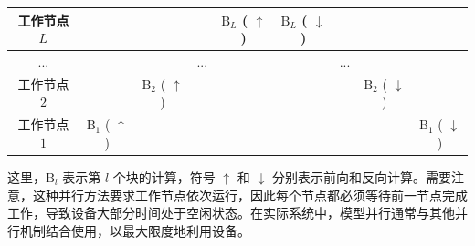\begin{itemize}
    \vspace{0.5em}
    \begin{center}
    \begingroup
    \renewcommand{\arraystretch}{1.6}
    \setlength{\tabcolsep}{2pt}
    {\small
    \begin{tabular}{c | c c c c c c c c}
    工作节点 $L$ & & & & \colorbox{blue!30}{$\mathrm{B}_L$} ({\color{blue} $\uparrow$}) & \colorbox{red!30}{$\mathrm{B}_L$} ({\color{red} $\downarrow$}) & & & \\ \hline
    ... & & & ... & & & ... & & \\ \hline
    工作节点 $2$ & & \colorbox{blue!30}{$\mathrm{B}_2$} ({\color{blue} $\uparrow$}) & & & & & \colorbox{red!30}{$\mathrm{B}_2$} ({\color{red} $\downarrow$}) & \\ \hline
    工作节点 $1$ & \colorbox{blue!30}{$\mathrm{B}_1$} ({\color{blue} $\uparrow$}) & & & & & & & \colorbox{red!30}{$\mathrm{B}_1$} ({\color{red} $\downarrow$})
    \end{tabular}
    }
    \endgroup
    \end{center}
    \vspace{0.5em}

    \noindent 这里，$\mathrm{B}_l$ 表示第 $l$ 个块的计算，符号 {\color{blue} $\uparrow$} 和 {\color{red} $\downarrow$} 分别表示前向和反向计算。需要注意，这种并行方法要求工作节点依次运行，因此每个节点都必须等待前一节点完成工作，导致设备大部分时间处于空闲状态。在实际系统中，模型并行通常与其他并行机制结合使用，以最大限度地利用设备。


\end{itemize}

